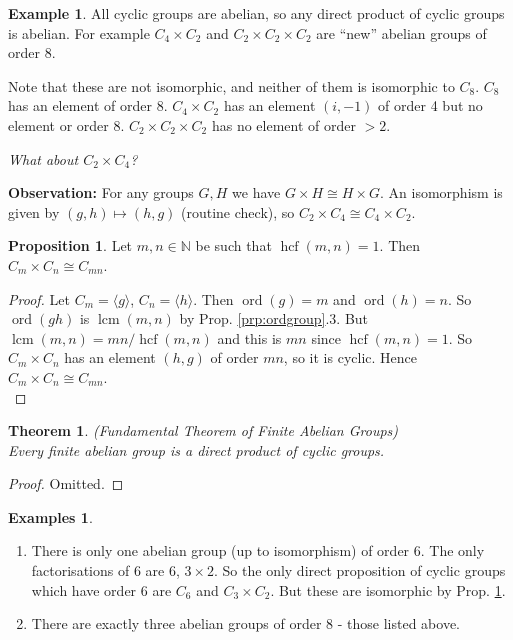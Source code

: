 \documentclass{article}
\newtheorem{theorem}{Theorem}
\theoremstyle{definition}
\newtheorem{proposition}{Proposition}
\newtheorem*{exmp}{Example}
\newtheorem*{exmps}{Examples}
\newcommand{\gene}[1]{\langle #1 \rangle}
\newcommand{\naturals}{\mathbb{N}}
\newcommand{\ism}{\cong}
\DeclareMathOperator{\lcm}{lcm}
\DeclareMathOperator{\hcf}{hcf}
\DeclareMathOperator{\ord}{\text{ord}}
\begin{document}
\begin{exmp}
  All cyclic groups are abelian, so any direct product of cyclic groups is abelian. For example $C_4 \times C_2$ and $C_2 \times C_2 \times C_2$ are ``new'' abelian groups of order 8.

  Note that these are not isomorphic, and neither of them is isomorphic to $C_8$. $C_8$ has an element of order 8. $C_4 \times C_2$ has an element $(i,-1)$ of order 4 but no element or order 8.  $C_2 \times C_2 \times C_2$ has no element of order $> 2$.

\end{exmp}
  \emph{What about $C_2 \times C_4$?}

  \textbf{Observation:} For any groups $G,H$ we have $G \times H \ism H \times G$. An isomorphism is given by $(g,h)\mapsto (h,g)$ (routine check), so $C_2 \times C_4 \ism C_4 \times C_2$.\\

  \begin{proposition}
  \label{prp:hcfcyclic}
    Let $m,n \in \naturals$ be such that $\hcf(m,n)=1$. Then $C_m \times C_n \ism C_{mn}$.
  \end{proposition}

  \begin{proof}
    Let $C_m = \gene{g}$, $C_n=\gene{h}$. Then $\ord(g)=m$ and $\ord(h)=n$. So $\ord(gh)$ is $\lcm(m,n)$ by Prop. \ref{prp:ordgroup}.3. But $\lcm(m,n)=mn/\hcf(m,n)$ and this is $mn$ since $\hcf(m,n)=1$. So $C_m \times C_n$ has an element $(h,g)$ of order $mn$, so it is cyclic. Hence $C_m \times C_n \ism C_{mn}$.\\
  \end{proof} 

  \begin{theorem}(Fundamental Theorem of Finite Abelian Groups)\hfill\\
    Every finite abelian group is a direct product of cyclic groups.
    \label{thm:funda}
  \end{theorem}

  \begin{proof}
    Omitted.
  \end{proof}

  \begin{exmps}\hfill
    \begin{enumerate}
      \item There is only one abelian group (up to isomorphism) of order 6. The only factorisations of 6 are 6, $3 \times 2$. So the only direct proposition of cyclic groups which have order 6 are $C_6$ and $C_3 \times C_2$. But these are isomorphic by Prop. \ref{prp:hcfcyclic}.
      \item There are exactly three abelian groups of order 8 - those listed above.
    \end{enumerate}
  \end{exmps}
\end{document}
